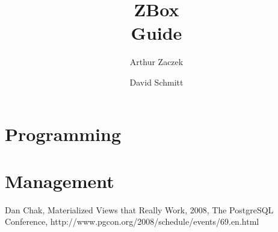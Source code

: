 \documentclass[a4paper,12pt]{report}
\begin{document}
\addtolength{\textheight}{2cm}
\addtolength{\topmargin}{-1cm}


\newcommand{\kw}{\it}
\newcommand{\new}{\bf}
\newcommand{\comment}{\it}

\title{ZBox\\Guide}
\author{Arthur Zaczek}
\author{David Schmitt}

\pagestyle{empty}



\tableofcontents

\setlength{\headheight}{15pt}

\pagestyle{fancy}

\renewcommand{\chaptermark}[1]{\markboth{\chaptername\ \thechapter.\ #1}{}}
\renewcommand{\sectionmark}[1]{\markright{\thesection.\ #1}}

\newenvironment{descriptionBorder}
{
  \begin{framed}
  \begin{description}[labelindent=3mm,leftmargin=*,topsep=0mm]
}
{
  \end{description}
  \end{framed}
}



\chapter{Programming}


\chapter{Management}




% 

\begin{thebibliography}{99}





Dan Chak, Materialized Views that Really Work,
2008, The PostgreSQL Conference, http://www.pgcon.org/2008/schedule/events/69.en.html

\end{thebibliography}

\listoffigures


\end{document}
